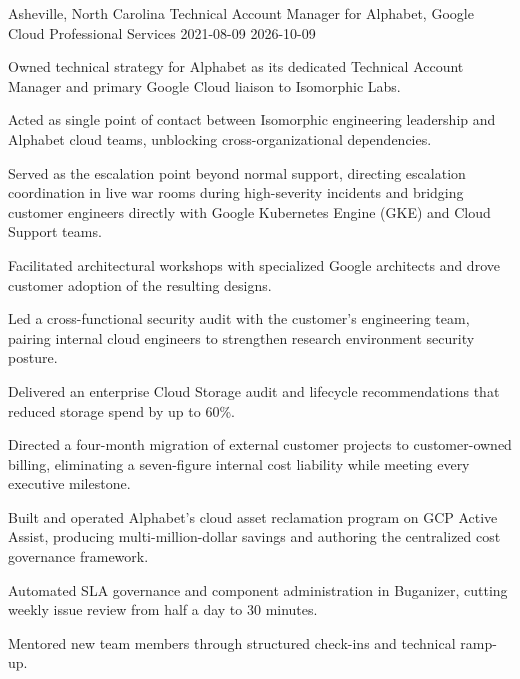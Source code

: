 \begin{role}
{\companygoogle}
{Asheville, North Carolina}
{Technical Account Manager for Alphabet, Google Cloud Professional Services}
{2021-08-09}
{2026-10-09}
    \item Owned technical strategy for Alphabet as its dedicated Technical Account Manager and primary Google Cloud liaison to Isomorphic Labs.
    \item Acted as single point of contact between Isomorphic engineering leadership and Alphabet cloud teams, unblocking cross-organizational dependencies.
    \item Served as the escalation point beyond normal support, directing escalation coordination in live war rooms during high-severity incidents and bridging customer engineers directly with Google Kubernetes Engine (GKE) and Cloud Support teams.
    \item Facilitated architectural workshops with specialized Google architects and drove customer adoption of the resulting designs.
    \item Led a cross-functional security audit with the customer's engineering team, pairing internal cloud engineers to strengthen research environment security posture.
    \item Delivered an enterprise Cloud Storage audit and lifecycle recommendations that reduced storage spend by up to 60\%.
    \item Directed a four-month migration of external customer projects to customer-owned billing, eliminating a seven-figure internal cost liability while meeting every executive milestone.
    \item Built and operated Alphabet's cloud asset reclamation program on GCP Active Assist, producing multi-million-dollar savings and authoring the centralized cost governance framework.
    \item Automated SLA governance and component administration in Buganizer, cutting weekly issue review from half a day to 30 minutes.
    \item Mentored new team members through structured check-ins and technical ramp-up.
\end{role}
